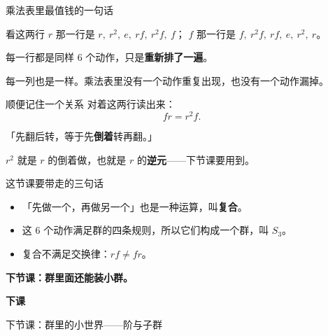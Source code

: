\documentclass[10pt]{beamer}
\begin{document}
\begin{frame}{乘法表里最值钱的一句话}
  \begin{block}{看这两行}
    \(r\) 那一行是 \(r,\ r^2,\ e,\ rf,\ r^2f,\ f\)；\quad
    \(f\) 那一行是 \(f,\ r^2f,\ rf,\ e,\ r^2,\ r\)。
  \end{block}
  \pause
  \begin{center}
    {\large 每一行都是同样 \(6\) 个动作，只是\textbf{重新排了一遍}。}
  \end{center}
  \pause
  \begin{att}
    每一列也是一样。乘法表里没有一个动作重复出现，也没有一个动作漏掉。
  \end{att}
\end{frame}

\begin{frame}{顺便记住一个关系}
  对着这两行读出来：
  \[
    fr = r^2f .
  \]
  \pause
  \begin{center}
    {\large 「先翻后转，等于先\textbf{倒着}转再翻。」}
  \end{center}
  \pause
  \begin{att}
    \(r^2\) 就是 \(r\) 的倒着做，也就是 \(r\) 的\textbf{逆元}——下节课要用到。
  \end{att}
\end{frame}

\begin{frame}{这节课要带走的三句话}
  \begin{itemize}
    \item 「先做一个，再做另一个」也是一种运算，叫\textbf{复合}。
    \item 这 \(6\) 个动作满足群的四条规则，所以它们构成一个群，叫 \(S_3\)。
    \item 复合不满足交换律：\(rf\neq fr\)。
  \end{itemize}
  \pause
  \begin{center}
    {\large\textcolor{textgreen}{\bfseries 下节课：群里面还能装小群。}}
  \end{center}
\end{frame}

\begin{frame}
  \begin{center}
    \vspace{1.6cm}
    {\Large\textcolor{textgreen}{\bfseries 下课}}

    \vspace{1.0cm}
    {\large\textcolor{accentgreen}{下节课：群里的小世界——阶与子群}}
  \end{center}
\end{frame}
\end{document}
